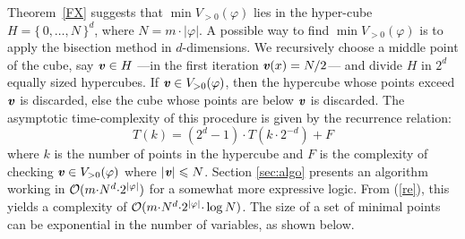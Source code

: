 \documentclass{llncs}
\newcommand{\set}[1]{\{ \, #1 \, \}}
\renewcommand{\leq}{\leqslant}
\renewcommand{\a}[1]{\textbf{\textit{#1}}}
\begin{document}
\noindent
Theorem~\ref{FX} suggests that $\min V_{>0}(\varphi)$ lies in the hyper-cube $H = \set{0,\hdots,N}^d$, where $N=m{\cdot}|\varphi|$. 
A possible way to find $\min V_{>0}(\varphi)$ is to apply the bisection method in $d$-dimensions.
We recursively choose a middle point of the cube, say ${\a v} \in H$ ---in the first iteration ${\a v}(x)=N/2$--- 
and divide $H$ in $2^d$ equally sized hypercubes. 
If ${{\a v}} \in V_{> 0}(\varphi)$, then the hypercube whose points exceed ${\a v}$ is discarded, else the cube whose points are below 
${\a v}$ is discarded. 
The asymptotic time-complexity of this procedure is given by the recurrence relation:
\begin{equation}\label{re}
T(k) = (2^d-1)\cdot T(k{\cdot}2^{{-}d}) + F
\end{equation} 
where $k$ is the number of points in the hypercube and $F$ is the complexity of checking ${\a v} \in V_{> 0}(\varphi)$ 
where $|\a v|\leq N$. 
Section \ref{sec:algo} presents an algorithm working in ${\cal O}(m{\cdot}N^{d}{\cdot}2^{|\varphi|})$ for a somewhat more expressive logic. 
From (\ref{re}), this yields a complexity of ${\cal O}(m{\cdot}N^d{\cdot}2^{|\varphi|}{\cdot}\log N )$. 
The size of a set of minimal points can be exponential in the number of variables, as shown below.
\end{document}
